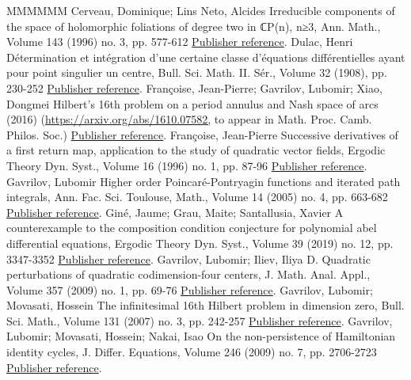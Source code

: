\begin{thebibliography}{MMMMMM}
 Cerveau, Dominique; Lins Neto, Alcides Irreducible components of the space of holomorphic foliations of degree two in ℂP(n), n≥3, Ann. Math., Volume 143 (1996) no. 3, pp. 577-612 \href{https://ahl.centre-mersenne.org/item/AHL_2020__3__615_0/#cerlin96}{Publisher reference}.
 Dulac, Henri Détermination et intégration d’une certaine classe d’équations différentielles ayant pour point singulier un centre, Bull. Sci. Math. II. Sér., Volume 32 (1908), pp. 230-252 \href{https://ahl.centre-mersenne.org/item/AHL_2020__3__615_0/#dul08}{Publisher reference}.
 Françoise, Jean-Pierre; Gavrilov, Lubomir; Xiao, Dongmei Hilbert’s 16th problem on a period annulus and Nash space of arcs (2016) (\url{https://arxiv.org/abs/1610.07582,} to appear in Math. Proc. Camb. Philos. Soc.) \href{https://ahl.centre-mersenne.org/item/AHL_2020__3__615_0/#gavr16}{Publisher reference}.
 Françoise, Jean-Pierre Successive derivatives of a first return map, application to the study of quadratic vector fields, Ergodic Theory Dyn. Syst., Volume 16 (1996) no. 1, pp. 87-96 \href{https://ahl.centre-mersenne.org/item/AHL_2020__3__615_0/#fran96}{Publisher reference}.
 Gavrilov, Lubomir Higher order Poincaré-Pontryagin functions and iterated path integrals, Ann. Fac. Sci. Toulouse, Math., Volume 14 (2005) no. 4, pp. 663-682 \href{https://ahl.centre-mersenne.org/item/AHL_2020__3__615_0/#gavr05}{Publisher reference}.
 Giné, Jaume; Grau, Maite; Santallusia, Xavier A counterexample to the composition condition conjecture for polynomial abel differential equations, Ergodic Theory Dyn. Syst., Volume 39 (2019) no. 12, pp. 3347-3352 \href{https://ahl.centre-mersenne.org/item/AHL_2020__3__615_0/#ggs18}{Publisher reference}.
 Gavrilov, Lubomir; Iliev, Iliya D. Quadratic perturbations of quadratic codimension-four centers, J. Math. Anal. Appl., Volume 357 (2009) no. 1, pp. 69-76 \href{https://ahl.centre-mersenne.org/item/AHL_2020__3__615_0/#gail09}{Publisher reference}.
 Gavrilov, Lubomir; Movasati, Hossein The infinitesimal 16th Hilbert problem in dimension zero, Bull. Sci. Math., Volume 131 (2007) no. 3, pp. 242-257 \href{https://ahl.centre-mersenne.org/item/AHL_2020__3__615_0/#gamo07}{Publisher reference}.
 Gavrilov, Lubomir; Movasati, Hossein; Nakai, Isao On the non-persistence of Hamiltonian identity cycles, J. Differ. Equations, Volume 246 (2009) no. 7, pp. 2706-2723 \href{https://ahl.centre-mersenne.org/item/AHL_2020__3__615_0/#gmn09}{Publisher reference}.

\end{thebibliography}
